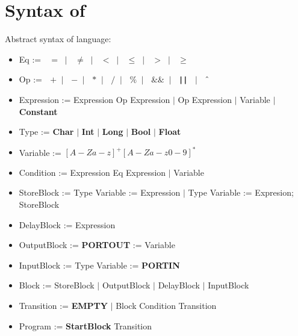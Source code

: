 \section{Syntax of \plcchart}
\label{sec:statechartsyn}

Abstract syntax of \plcchart language:
\begin{definition}
\plcchart

\begin{itemize}
	\item Eq := $\;$ \boldmath$=$\unboldmath $\; \mid \;$ \boldmath$\neq$\unboldmath $\; \mid \;$ \boldmath$<$\unboldmath $\; \mid \;$ \boldmath$\leq$\unboldmath $\; \mid \;$ \boldmath$>$\unboldmath $\; \mid \;$ \boldmath$\geq$\unboldmath	
	\item Op := $\;$ \boldmath$+$\unboldmath $\; \mid \;$ \boldmath$-$\unboldmath $\; \mid \;$ \boldmath$*$\unboldmath $\; \mid \;$ \boldmath$/$\unboldmath $\; \mid \;$ \boldmath$\%$\unboldmath $\; \mid \;$ \boldmath$\&\&$\unboldmath $\; \mid \;$ \textbf{\texttt{||}} $\; \mid \;$ \boldmath$\mathbin{\char`\^}$\unboldmath

	\item Expression := Expression Op Expression $\mid$ Op Expression $\mid$ Variable $\mid$ \textbf{Constant}
	
	\item Type := \textbf{Char} $\mid$ \textbf{Int} $\mid$ \textbf{Long} $\mid$ \textbf{Bool} $\mid$ \textbf{Float}
	\item Variable := $[A-Za-z]^+[A-Za-z0-9]^*$

	\item Condition := Expression Eq Expression $\mid$ Variable

		
	\item StoreBlock := Type Variable := Expression $\mid$ Type Variable := Expresion; StoreBlock
	\item DelayBlock := Expression
	\item OutputBlock := \textbf{PORTOUT} := Variable
	\item InputBlock := Type Variable := \textbf{PORTIN}
	\item Block := StoreBlock $\mid$ OutputBlock $\mid$ DelayBlock $\mid$ InputBlock

	
	\item Transition := \textbf{EMPTY} $\mid$ Block Condition Transition
	
	\item Program := \textbf{StartBlock} Transition
\end{itemize}
\end{definition}

